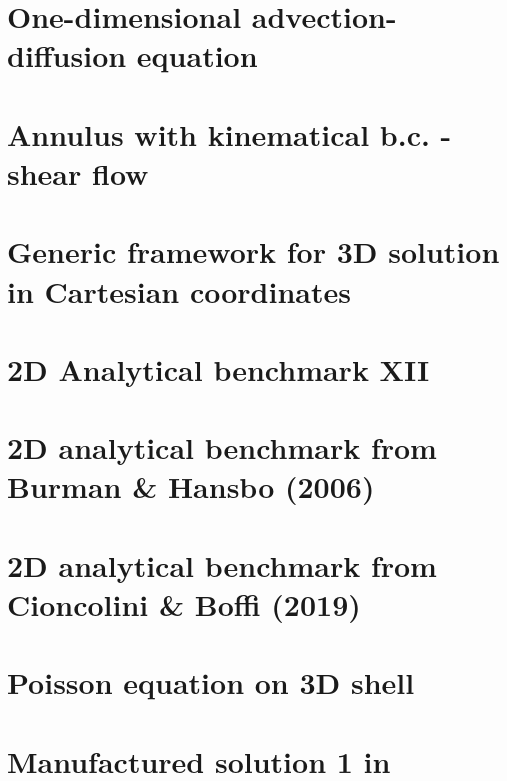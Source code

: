 \section{One-dimensional advection-diffusion equation \label{ss:advdiff} }


\section{Annulus with kinematical b.c. - shear flow}\label{ss:sfan}


\section{Generic framework for 3D solution in Cartesian coordinates}\label{ss:mms3Dgen}


\section{2D Analytical benchmark XII}\label{ss:sofo87_2D}


\section{2D analytical benchmark from Burman \& Hansbo (2006)}\label{ss:mms_buha06}


\section{2D analytical benchmark from Cioncolini \& Boffi (2019) \label{ss:mms_cibo19}}


\section{Poisson equation on 3D shell}
 

\section{Manufactured solution 1 in \textcite{jolm17}  \label{ss:mms_jolm17a}}

